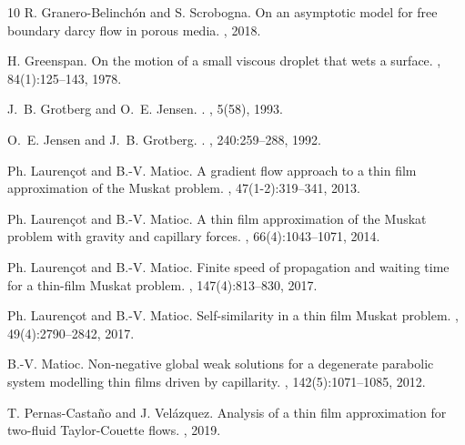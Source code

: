 \documentclass[reqno,11pt]{amsart}
\begin{document}
{\begin{thebibliography}{10}
R. Granero-Belinch{\'o}n and S. Scrobogna.
\newblock On an asymptotic model for free boundary darcy flow in porous media.
, 2018.

H. Greenspan.
\newblock On the motion of a small viscous droplet that wets a surface.
, 84(1):125--143, 1978.

J.~B. Grotberg and O.~E. Jensen.
.
, 5(58), 1993.

O.~E. Jensen and J.~B. Grotberg.
.
, 240:259--288, 1992.

Ph. Lauren{\c{c}}ot and B.-V. Matioc.
\newblock A gradient flow approach to a thin film approximation of the {M}uskat
  problem.
,
  47(1-2):319--341, 2013.

Ph. Lauren{\c{c}}ot and B.-V. Matioc.
\newblock A thin film approximation of the {M}uskat problem with gravity and
  capillary forces.
, 66(4):1043--1071,
  2014.

Ph. Lauren{\c{c}}ot and B.-V. Matioc.
\newblock Finite speed of propagation and waiting time for a thin-film {M}uskat
  problem.
, 147(4):813--830, 2017.

Ph. Lauren{\c{c}}ot and B.-V. Matioc.
\newblock Self-similarity in a thin film {M}uskat problem.
, 49(4):2790--2842, 2017.

B.-V. Matioc.
\newblock Non-negative global weak solutions for a degenerate parabolic system
  modelling thin films driven by capillarity.
, 142(5):1071--1085, 2012.

T. Pernas-Casta{\~n}o and J. Vel{\'a}zquez.
\newblock Analysis of a thin film approximation for two-fluid Taylor-Couette
  flows.
, 2019.


\end{thebibliography}}
\end{document}
